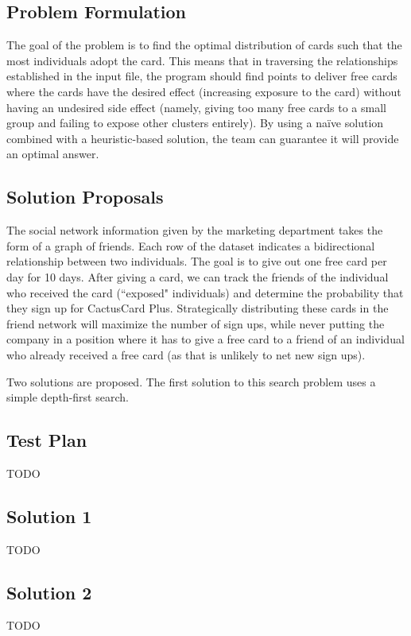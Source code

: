 \documentclass[11pt,journal]{IEEEtran}
\begin{document}
\subsection{Problem Formulation}
The goal of the problem is to find the optimal distribution of cards such that the most individuals adopt the card. This means that in traversing the relationships established in the input file, the program should find points to deliver free cards where the cards have the desired effect (increasing exposure to the card) without having an undesired side effect (namely, giving too many free cards to a small group and failing to expose other clusters entirely). By using a na{\"i}ve solution combined with a heuristic-based solution, the team can guarantee it will provide an optimal answer.

\subsection{Solution Proposals}
The social network information given by the marketing department takes the form of a graph of friends. Each row of the dataset indicates a bidirectional relationship between two individuals. The goal is to give out one free card per day for 10 days. After giving a card, we can track the friends of the individual who received the card (``exposed" individuals) and determine the probability that they sign up for CactusCard Plus. Strategically distributing these cards in the friend network will maximize the number of sign ups, while never putting the company in a position where it has to give a free card to a friend of an individual who already received a free card (as that is unlikely to net new sign ups).
\par
Two solutions are proposed. The first solution to this search problem uses a simple depth-first search. 

\subsection{Test Plan}
TODO

\subsection{Solution 1}
TODO

\subsection{Solution 2}
TODO
\end{document}
